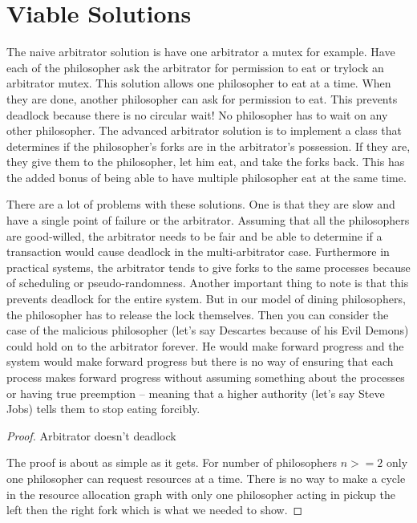 \section{Viable Solutions}

The naive arbitrator solution is have one arbitrator a mutex for example.
Have each of the philosopher ask the arbitrator for permission to eat or trylock an arbitrator mutex.
This solution allows one philosopher to eat at a time.
When they are done, another philosopher can ask for permission to eat.
This prevents deadlock because there is no circular wait! No philosopher has to wait on any other philosopher.
The advanced arbitrator solution is to implement a class that determines if the philosopher's forks are in the arbitrator's possession.
If they are, they give them to the philosopher, let him eat, and take the forks back.
This has the added bonus of being able to have multiple philosopher eat at the same time.

There are a lot of problems with these solutions.
One is that they are slow and have a single point of failure or the arbitrator.
Assuming that all the philosophers are good-willed, the arbitrator needs to be fair and be able to determine if a transaction would cause deadlock in the multi-arbitrator case.
Furthermore in practical systems, the arbitrator tends to give forks to the same processes because of scheduling or pseudo-randomness.
Another important thing to note is that this prevents deadlock for the entire system.
But in our model of dining philosophers, the philosopher has to release the lock themselves.
Then you can consider the case of the malicious philosopher (let's say Descartes because of his Evil Demons) could hold on to the arbitrator forever.
He would make forward progress and the system would make forward progress but there is no way of ensuring that each process makes forward progress without assuming something about the processes or having true preemption -- meaning that a higher authority (let's say Steve Jobs) tells them to stop eating forcibly.


\begin{proof} Arbitrator doesn't deadlock

The proof is about as simple as it gets. For number of philosophers $n >= 2$ only one philosopher can request resources at a time. There is no way to make a cycle in the resource allocation graph with only one philosopher acting in pickup the left then the right fork which is what we needed to show.

\end{proof}

